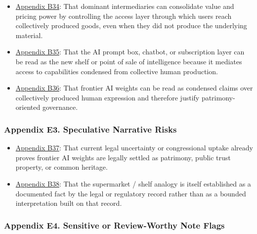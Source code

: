\documentclass[
  american,
  11pt,
  letterpaper,
]{article}
\providecommand{\tightlist}{%
  \setlength{\itemsep}{0pt}\setlength{\parskip}{0pt}}
\begin{document}
\begin{itemize}
\tightlist
\item
  \hyperref[appendix-b34-dominant-intermediaries-can-consolidate-value-and-pricing-power-by-controlling-th]{Appendix
  B34}: That dominant intermediaries can consolidate value and pricing
  power by controlling the access layer through which users reach
  collectively produced goods, even when they did not produce the
  underlying material.
\item
  \hyperref[appendix-b35-the-ai-prompt-box-chatbot-or-subscription-layer-can-be-read-as-the-new-shelf-or]{Appendix
  B35}: That the AI prompt box, chatbot, or subscription layer can be
  read as the new shelf or point of sale of intelligence because it
  mediates access to capabilities condensed from collective human
  production.
\item
  \hyperref[appendix-b36-frontier-ai-weights-can-be-read-as-condensed-claims-over-collectively-produced-hu]{Appendix
  B36}: That frontier AI weights can be read as condensed claims over
  collectively produced human expression and therefore justify
  patrimony-oriented governance.
\end{itemize}

\subsubsection{Appendix E3. Speculative Narrative
Risks}\label{appendix-e3-speculative-narrative-risks}

\begin{itemize}
\tightlist
\item
  \hyperref[appendix-b37-current-legal-uncertainty-or-congressional-uptake-already-proves-frontier-ai-weig]{Appendix
  B37}: That current legal uncertainty or congressional uptake already
  proves frontier AI weights are legally settled as patrimony, public
  trust property, or common heritage.
\item
  \hyperref[appendix-b38-the-supermarket-shelf-analogy-is-itself-established-as-a-documented-fact-by-the]{Appendix
  B38}: That the supermarket / shelf analogy is itself established as a
  documented fact by the legal or regulatory record rather than as a
  bounded interpretation built on that record.
\end{itemize}

\subsubsection{Appendix E4. Sensitive or Review-Worthy Note
Flags}\label{appendix-e4-sensitive-or-review-worthy-note-flags}
\end{document}
